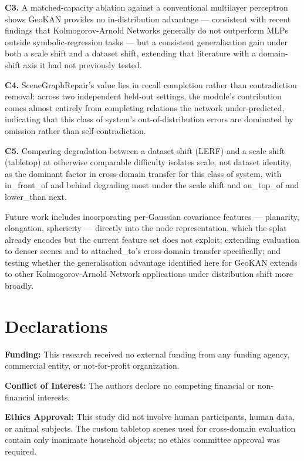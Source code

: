 \documentclass[sn-mathphys,Numbered]{sn-jnl}
\begin{document}
\textbf{C3.} A matched-capacity ablation against a conventional multilayer perceptron shows GeoKAN provides no in-distribution advantage --- consistent with recent findings that Kolmogorov-Arnold Networks generally do not outperform MLPs outside symbolic-regression tasks --- but a consistent generalisation gain under both a scale shift and a dataset shift, extending that literature with a domain-shift axis it had not previously tested.

\textbf{C4.} SceneGraphRepair's value lies in recall completion rather than contradiction removal: across two independent held-out settings, the module's contribution comes almost entirely from completing relations the network under-predicted, indicating that this class of system's out-of-distribution errors are dominated by omission rather than self-contradiction.

\textbf{C5.} Comparing degradation between a dataset shift (LERF) and a scale shift (tabletop) at otherwise comparable difficulty isolates scale, not dataset identity, as the dominant factor in cross-domain transfer for this class of system, with in\_front\_of and behind degrading most under the scale shift and on\_top\_of and lower\_than next.

Future work includes incorporating per-Gaussian covariance features --- planarity, elongation, sphericity --- directly into the node representation, which the splat already encodes but the current feature set does not exploit; extending evaluation to denser scenes and to attached\_to's cross-domain transfer specifically; and testing whether the generalisation advantage identified here for GeoKAN extends to other Kolmogorov-Arnold Network applications under distribution shift more broadly.

\backmatter

\section*{Declarations}

\textbf{Funding:} This research received no external funding from any funding agency, commercial entity, or not-for-profit organization.

\textbf{Conflict of Interest:} The authors declare no competing financial or non-financial interests.

\textbf{Ethics Approval:} This study did not involve human participants, human data, or animal subjects. The custom tabletop scenes used for cross-domain evaluation contain only inanimate household objects; no ethics committee approval was required.
\end{document}

